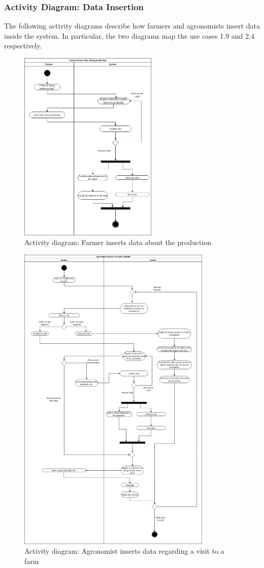 \documentclass[10pt]{report}
\begin{document}
\subsubsection{Activity Diagram: Data Insertion}
The following activity diagrams describe how farmers and agronomists insert data inside the system. In particular, the two diagrams map the use cases 1.9 and 2.4 respectively.
\begin{figure}[H]
    \centering
    \includegraphics[width=250px]{ActivityDiagrams/FarmerInsert.jpg}
    \caption{Activity diagram: Farmer inserts data about the production}
\end{figure}
\begin{figure}[H]
    \centering
    \includegraphics[width=350px]{ActivityDiagrams/AgronomistInsert.jpg}
    \caption{Activity diagram: Agronomist inserts data regarding a visit to a farm}
\end{figure}
\end{document}
